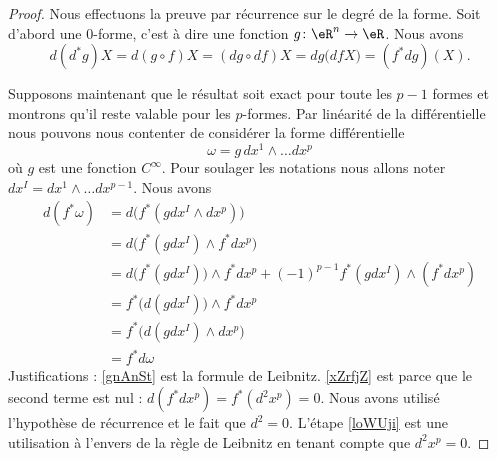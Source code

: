 \begin{proof}
    Nous effectuons la preuve par récurrence sur le degré de la forme. Soit d'abord une \( 0\)-forme, c'est à dire une fonction \( g\colon \eR^n\to \eR\). Nous avons
    \begin{equation}
        d(d^*g)X=d(g\circ f)X=(dg\circ df)X=dg\big( df X \big)=(f^*dg)(X).
    \end{equation}
    
    Supposons maintenant que le résultat soit exact pour toute les \( p-1\) formes et montrons qu'il reste valable pour les \( p\)-formes. Par linéarité de la différentielle nous pouvons nous contenter de considérer la forme différentielle
    \begin{equation}
        \omega=g\,dx^1\wedge\ldots dx^p
    \end{equation}
    où \( g\) est une fonction \(  C^{\infty}\). Pour soulager les notations nous allons noter \( dx^I=dx^1\wedge\ldots dx^{p-1}\). Nous avons
    \begin{subequations}
        \begin{align}
            d(f^*\omega)&=d\big( f^*(gdx^I\wedge dx^p) \big)\\
            &=d\big( f^*(gdx^I)\wedge f^*dx^p \big)\\
            &=d\big( f^*(gdx^I)\big)\wedge f^*dx^p+(-1)^{p-1}f^*(gdx^I)\wedge(f^*dx^p)  \label{gnAnSt}\\
            &=f^*\big( d(gdx^I) \big)\wedge f^*dx^p      \label{xZrfjZ}\\
            &=f^*\big( d(gdx^I)\wedge dx^p \big)\\
            &=f^*d\omega        \label{loWUji}
        \end{align}
    \end{subequations}
    Justifications : \eqref{gnAnSt} est la formule de Leibnitz. \eqref{xZrfjZ} est parce que le second terme est nul : \( d(f^*dx^p)=f^*(d^2x^p)=0\). Nous avons utilisé l'hypothèse de récurrence et le fait que \( d^2=0\). L'étape \eqref{loWUji} est une utilisation à l'envers de la règle de Leibnitz en tenant compte que \( d^2x^p=0\).
\end{proof}


